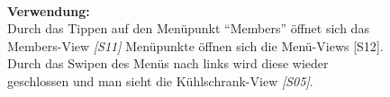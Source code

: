 \documentclass[a4paper]{scrreprt}
\begin{document}
\begin{figure}[h]
\begin{minipage}[b]{0.55\linewidth}
\begin{itemize}
    			\end{itemize}
    		
	    		\hfill
	    		\\
    			
    			\textbf{Verwendung:}\\
    			Durch das Tippen auf den Menüpunkt
    			``Members” öffnet sich das Members-View \textit{{[}S11{]}}
    			Menüpunkte öffnen sich die Menü-Views {[}S12{]}.\\ Durch das Swipen des Menüs nach links wird diese wieder geschlossen und man sieht die Kühlschrank-View \textit{{[}S05{]}}.
    			
    			\vspace{1mm}
    			
    		\end{minipage}
    	\end{figure}
    	
\end{document}
